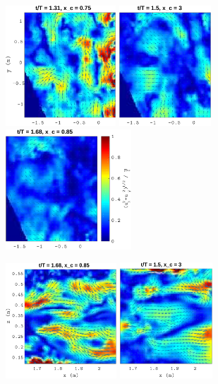 \begin{figure}[htb]
\centerline{
\includegraphics[width=4.14cm]{paper_05_milestone_issf/Figures/exp21/vh_400.pdf}
\includegraphics[width=3.44cm]{paper_05_milestone_issf/Figures/exp21/vh_655.pdf}
\includegraphics[width=4.72cm]{paper_05_milestone_issf/Figures/exp21/vh_890.pdf}}
\vspace{0mm}
\centerline{
\includegraphics[width=4.16cm]{paper_05_milestone_issf/Figures/exp21/vv_890.pdf}
\includegraphics[width=3.48cm]{paper_05_milestone_issf/Figures/exp21/vv_655.pdf}
}
\end{figure}
